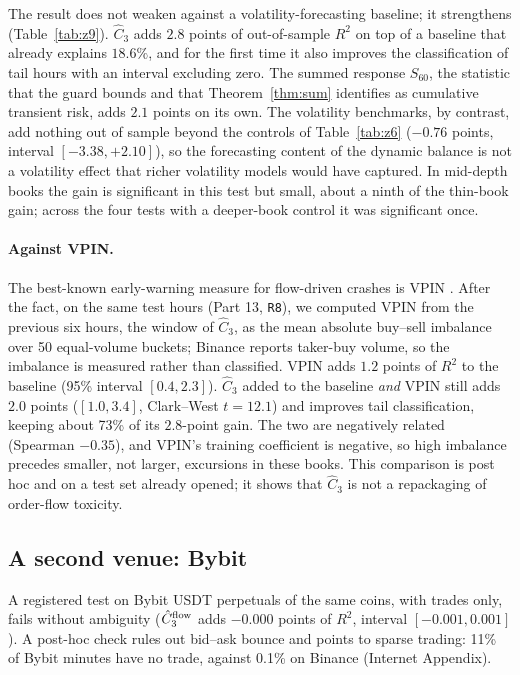 \documentclass[12pt]{article}
\theoremstyle{definition}
\theoremstyle{remark}
\begin{document}
The result does not weaken against a volatility-forecasting baseline; it strengthens (Table~\ref{tab:z9}). $\hat C_3$ adds $2.8$ points of out-of-sample $R^2$ on top of a baseline that already explains $18.6\%$, and for the first time it also improves the classification of tail hours with an interval excluding zero. The summed response $S_{60}$, the statistic that the guard bounds and that Theorem~\ref{thm:sum} identifies as cumulative transient risk, adds $2.1$ points on its own. The volatility benchmarks, by contrast, add nothing out of sample beyond the controls of Table~\ref{tab:z6} ($-0.76$ points, interval $[-3.38,+2.10]$), so the forecasting content of the dynamic balance is not a volatility effect that richer volatility models would have captured. In mid-depth books the gain is significant in this test but small, about a ninth of the thin-book gain; across the four tests with a deeper-book control it was significant once.

\paragraph{Against VPIN.} The best-known early-warning measure for flow-driven crashes is VPIN \citep{easley2012}. After the fact, on the same test hours (Part 13, \texttt{R8}), we computed VPIN from the previous six hours, the window of $\hat C_3$, as the mean absolute buy--sell imbalance over 50 equal-volume buckets; Binance reports taker-buy volume, so the imbalance is measured rather than classified. VPIN adds $1.2$ points of $R^2$ to the baseline (95\% interval $[0.4,2.3]$). $\hat C_3$ added to the baseline \emph{and} VPIN still adds $2.0$ points ($[1.0,3.4]$, Clark--West $t=12.1$) and improves tail classification, keeping about 73\% of its $2.8$-point gain. The two are negatively related (Spearman $-0.35$), and VPIN's training coefficient is negative, so high imbalance precedes smaller, not larger, excursions in these books. This comparison is post hoc and on a test set already opened; it shows that $\hat C_3$ is not a repackaging of order-flow toxicity.

\subsection{A second venue: Bybit}\label{sec:bybit}
A registered test on Bybit USDT perpetuals of the same coins, with trades only, fails without ambiguity ($\hat C_3^{\rm flow}$ adds $-0.000$ points of $R^2$, interval $[-0.001,0.001]$). A post-hoc check rules out bid--ask bounce and points to sparse trading: 11\% of Bybit minutes have no trade, against 0.1\% on Binance (Internet Appendix).
\end{document}
